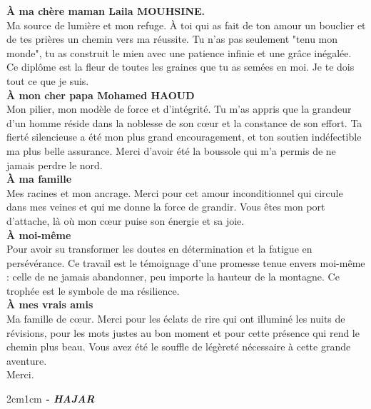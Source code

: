 \dedicace

\begin{fquote}
\begin{center}
\large{
\textbf{\uppercase{à} ma chère maman Laila MOUHSINE.}\\ Ma source de lumière et mon refuge. À toi qui as fait de ton amour un bouclier et de tes prières un chemin vers ma réussite. Tu n'as pas seulement "tenu mon monde", tu as construit le mien avec une patience infinie et une grâce inégalée. Ce diplôme est la fleur de toutes les graines que tu as semées en moi. Je te dois tout ce que je suis.\\[12pt]
\textbf{\uppercase{à} mon cher papa Mohamed HAOUD} \\ Mon pilier, mon modèle de force et d'intégrité. Tu m'as appris que la grandeur d'un homme réside dans la noblesse de son cœur et la constance de son effort. Ta fierté silencieuse a été mon plus grand encouragement, et ton soutien indéfectible ma plus belle assurance. Merci d'avoir été la boussole qui m'a permis de ne jamais perdre le nord.\\[12pt]
\textbf{\uppercase{à} ma famille} \\Mes racines et mon ancrage. Merci pour cet amour inconditionnel qui circule dans mes veines et qui me donne la force de grandir. Vous êtes mon port d'attache, là où mon cœur puise son énergie et sa joie.\\[12pt]
\textbf{\uppercase{à} moi-même} \\ Pour avoir su transformer les doutes en détermination et la fatigue en persévérance. Ce travail est le témoignage d'une promesse tenue envers moi-même : celle de ne jamais abandonner, peu importe la hauteur de la montagne. Ce trophée est le symbole de ma résilience. \\[12pt]
\textbf{\uppercase{à} mes vrais amis} \\ Ma famille de cœur. Merci pour les éclats de rire qui ont illuminé les nuits de révisions, pour les mots justes au bon moment et pour cette présence qui rend le chemin plus beau. Vous avez été le souffle de légèreté nécessaire à cette grande aventure.\\[12pt]
Merci.
}
\end{center}
\bigskip
\medskip
\end{fquote}

\begin{adjustwidth}{2cm}{1cm}
\hspace*{\fill} \textbf{\textit{\large{- HAJAR}}} \hspace*{\fill}
\end{adjustwidth}

\clearpage
